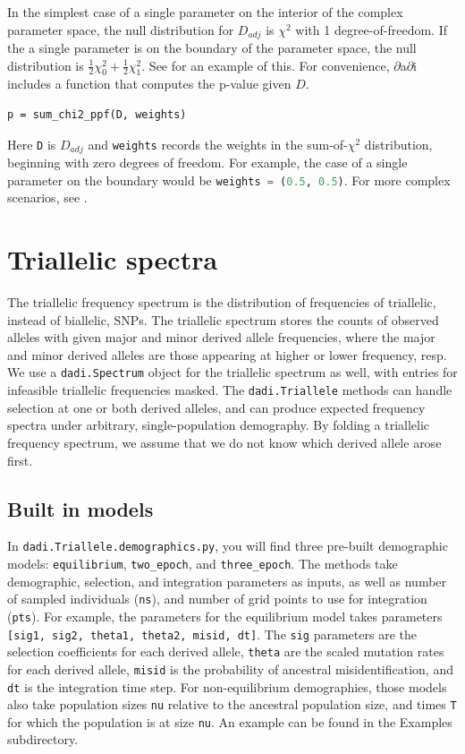 \documentclass[12pt]{article}
\makeatletter
\newcommand{\dadi}{$\partial$a$\partial$i\xspace}
\newcommand{\py}[1]{\lstinline[language=Python, showstringspaces=False]@#1@}
\makeatother
\begin{document}
In the simplest case of a single parameter on the interior of the complex parameter space, the null distribution for $D_{adj}$ is $\chi^2$ with 1 degree-of-freedom.
If the a single parameter is on the boundary of the parameter space, the null distribution is $\frac{1}{2}\chi^2_0 + \frac{1}{2}\chi^2_1$.
See \cite{Coffman2016} for an example of this.
For convenience, \dadi includes a function that computes the p-value given $D$.
\begin{lstlisting}
p = sum_chi2_ppf(D, weights)
\end{lstlisting}
Here \py{D} is $D_{adj}$ and \py{weights} records the weights in the sum-of-$\chi^2$ distribution, beginning with zero degrees of freedom.
For example, the case of a single parameter on the boundary would be \py{weights = (0.5, 0.5)}.
For more complex scenarios, see \cite{Self1987}.

\section{Triallelic spectra}
The triallelic frequency spectrum is the distribution of frequencies of triallelic, instead of biallelic, SNPs.
The triallelic spectrum stores the counts of observed alleles with given major and minor derived allele frequencies, where the major and minor derived alleles are those appearing at higher or lower frequency, resp.
We use a \py{dadi.Spectrum} object for the triallelic spectrum as well, with entries for infeasible triallelic frequencies masked.
The \py{dadi.Triallele} methods can handle selection at one or both derived alleles, and can produce expected frequency spectra under arbitrary, single-population demography.
By folding a triallelic frequency spectrum, we assume that we do not know which derived allele arose first.
\subsection{Built in models}
In \py{dadi.Triallele.demographics.py}, you will find three pre-built demographic models: \py{equilibrium}, \py{two_epoch}, and \py{three_epoch}.
The methods take demographic, selection, and integration parameters as inputs, as well as number of sampled individuals (\py{ns}), and number of grid points to use for integration (\py{pts}).
For example, the parameters for the equilibrium model takes parameters \py{[sig1, sig2, theta1, theta2, misid, dt]}.
The \py{sig} parameters are the selection coefficients for each derived allele, \py{theta} are the scaled mutation rates for each derived allele, \py{misid} is the probability of ancestral misidentification, and \py{dt} is the integration time step.
For non-equilibrium demographies, those models also take population sizes \py{nu} relative to the ancestral population size, and times \py{T} for which the population is at size \py{nu}.
An example can be found in the Examples subdirectory.
\end{document}
